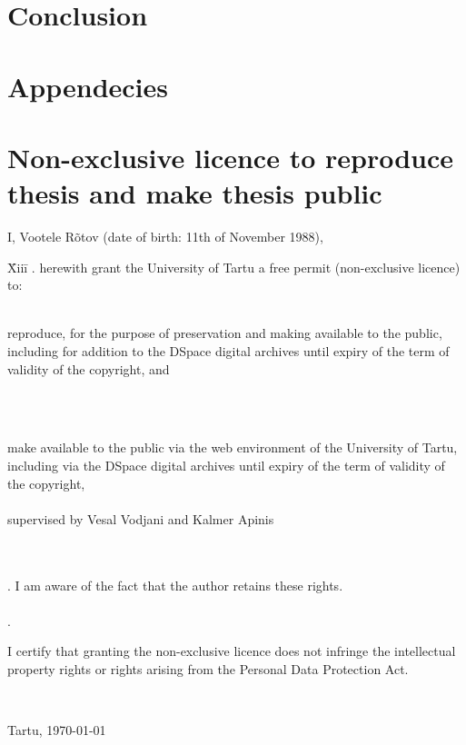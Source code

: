 \documentclass{style/master-thesis}
\begin{document}
\clearpage
\section{Conclusion} 



\newpage

{}


\newpage

\appendix
\section*{Appendecies}
\renewcommand{\thesubsection}{\Alph{subsection}}

\pagebreak
\section*{\small Non-exclusive licence to reproduce thesis and make thesis public}


I, Vootele Rõtov (date of birth: 11th of November 1988),

\begin{tabbing}
\= Xiii\=\kill
{}. \> herewith grant the University of Tartu a free permit (non-exclusive licence) to:\\\\ 

\> 
\begin{minipage}[t]{14.2cm}
reproduce, for the purpose of preservation and making available to the public, including for addition to the DSpace digital archives until expiry of the term of validity of the copyright, and
\end{minipage}
\\\\
\begin{minipage}[t]{14.2cm}
make available to the public via the web environment of the University of Tartu, including via the DSpace digital archives until expiry of the term of validity of the copyright,\\ 

\articleName\\   

supervised by Vesal Vodjani and Kalmer Apinis

\end{minipage}\\\\ 
. \>I am aware of the fact that the author retains these rights.\\\\
. \>
\begin{minipage}[t]{14.2cm}
I certify that granting the non-exclusive licence does not infringe the intellectual property rights or rights arising from the Personal Data Protection Act. 
\end{minipage}\\
\end{tabbing}

\noindent
Tartu, \today
\end{document}
